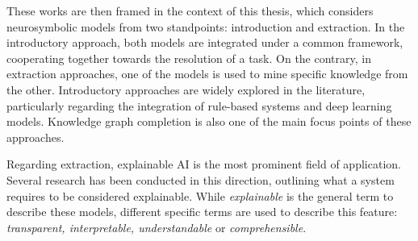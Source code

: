 These works are then framed in the context of this thesis, which considers neurosymbolic models from two standpoints: introduction and extraction. In the introductory approach, both models are integrated under a common framework, cooperating together towards the resolution of a task. On the contrary, in extraction approaches, one of the models is used to mine specific knowledge from the other. Introductory approaches are widely explored in the literature, particularly regarding the integration of rule-based systems and deep learning models. Knowledge graph completion is also one of the main focus points of these approaches. 

Regarding extraction, explainable AI is the most prominent field of application. Several research has been conducted in this direction, outlining what a system requires to be considered explainable. While \textit{explainable} is the general term to describe these models, different specific terms are used to describe this feature: \textit{transparent, interpretable, understandable} or \textit{comprehensible}. 

